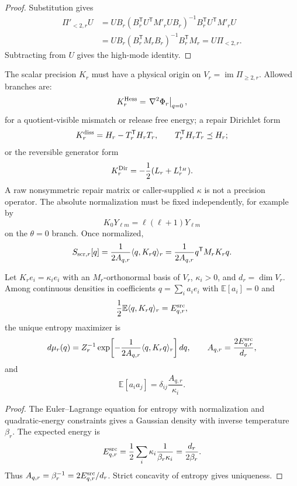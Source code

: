 \begin{proof}
Substitution gives
\[
\begin{aligned}
\Pi'_{<2,r}U
&=UB_r(B_r^{\mathsf T}U^{\mathsf T}M'_rUB_r)^{-1}B_r^{\mathsf T}U^{\mathsf T}M'_rU\\
&=UB_r(B_r^{\mathsf T}M_rB_r)^{-1}B_r^{\mathsf T}M_r=U\Pi_{<2,r}.
\end{aligned}
\]
Subtracting from \(U\) gives the high-mode identity.
\end{proof}

\begin{definition}\label{def:oph-screen-precision}
The scalar precision \(K_r\) must have a physical origin on \(V_r=\operatorname{im}\Pi_{\ge2,r}\).
Allowed branches are:
\[
  K_r^{\rm Hess}=\left.\nabla^2\Phi_r\right|_{q=0},
\]
for a quotient-visible mismatch or release free energy; a repair Dirichlet form
\[
  K_r^{\rm diss}=H_r-T_r^{\mathsf T}H_rT_r,\qquad T_r^{\mathsf T}H_rT_r\preceq H_r;
\]
or the reversible generator form
\[
  K_r^{\rm Dir}=-\frac12(L_r+L_r^{\dagger_H}).
\]
A raw nonsymmetric repair matrix or caller-supplied \(\kappa\) is not a precision operator.  The
absolute normalization must be fixed independently, for example by
\[
  K_0Y_{\ell m}=\ell(\ell+1)Y_{\ell m}
\]
on the \(\theta=0\) branch.  Once normalized,
\[
  S_{{\rm scr},r}[q]=\frac{1}{2A_{q,r}}\langle q,K_rq\rangle_r
  =\frac{1}{2A_{q,r}}q^{\mathsf T}M_rK_rq .
\]
\end{definition}

\begin{theorem}\label{thm:oph-screen-maxent}
Let \(K_re_i=\kappa_i e_i\) with an \(M_r\)-orthonormal basis of \(V_r\), \(\kappa_i>0\), and
\(d_r=\dim V_r\).  Among continuous densities in coefficients \(q=\sum_i a_ie_i\) with
\(\mathbb E[a_i]=0\) and
\[
  \frac12\mathbb E\langle q,K_rq\rangle_r=E^{\rm src}_{q,r},
\]
the unique entropy maximizer is
\[
  d\mu_r(q)=Z_r^{-1}
  \exp\!\left[-\frac{1}{2A_{q,r}}\langle q,K_rq\rangle_r\right]dq,
  \qquad
  A_{q,r}=\frac{2E^{\rm src}_{q,r}}{d_r},
\]
and
\[
  \mathbb E[a_ia_j]=\delta_{ij}\frac{A_{q,r}}{\kappa_i}.
\]
\end{theorem}

\begin{proof}
The Euler--Lagrange equation for entropy with normalization and quadratic-energy constraints gives
a Gaussian density with inverse temperature \(\beta_r\).  The expected energy is
\[
  E^{\rm src}_{q,r}=\frac12\sum_i\kappa_i\frac1{\beta_r\kappa_i}=\frac{d_r}{2\beta_r}.
\]
Thus \(A_{q,r}=\beta_r^{-1}=2E^{\rm src}_{q,r}/d_r\).  Strict concavity of entropy gives
uniqueness.
\end{proof}

